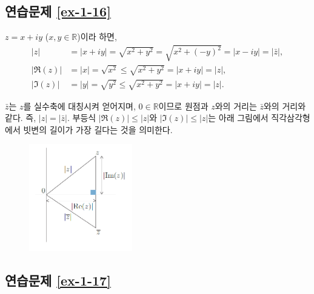 \subsection*{연습문제 \ref{ex-1-16}}

$z = x+iy$ ($x,y\in\mathbb R$)이라 하면,
\begin{align*}
|z| &= |x+iy| = \sqrt{x^2+y^2} = \sqrt{x^2+(-y)^2} = |x-iy| = |\bar z|, \\
|\Re(z)| & =  |x| = \sqrt{x^2} \le  \sqrt{x^2+y^2} = |x+iy| = |z|, \\
|\Im(z)| &= |y| = \sqrt{y^2} \le  \sqrt{x^2+y^2} = |x+iy| = |z|.
\end{align*}

$\bar z$는 $z$를 실수축에 대칭시켜 얻어지며,
$0\in\mathbb R$이므로 원점과 $z$와의 거리는 $\bar z$와의 거리와 같다.
즉, $ |z| = |\bar z|$.
부등식 $|\Re(z)| \le|z|$와 $|\Im(z)|\le |z|$는 
아래 그림에서 직각삼각형에서 빗변의 길이가 가장 길다는 것을 의미한다.

\begin{figure}[h!]
\begin{center}
\includegraphics[width=0.4\textwidth]{./Solution/figs/fig-s-0-1}
\end{center}
\end{figure}

\subsection*{연습문제 \ref{ex-1-17}}

